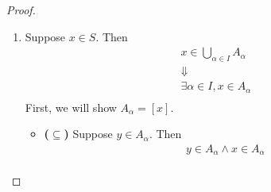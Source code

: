 \begin{proof}
\begin{enumerate}[label=\textbf{(\Alph*)}]
\begin{itemize}
\begin{itemize}
                  \end{itemize}
                  Then
                  \begin{itemize}
                    \item $\exists \alpha \in I, x \in A_{\alpha} \land y \in A_{\alpha}$
                    \item $\exists \beta \in I, y \in A_{\beta} \land z \in A_{\beta}$
                  \end{itemize}
                  Therefore,
                  \[
                    \begin{array}{c}
                      y \in A_{\alpha} \land y \in A_{\beta}  \\
                      \Downarrow                              \\
                      A_{\alpha} \cap A_{\beta} \neq \vnot    \\
                      \Downarrow                              \\
                      \alpha = \beta                          \\
                      \Downarrow                              \\
                      x \in A_{\alpha} \land z \in A_{\alpha} \\
                      \Downarrow                              \\
                      x \sim z
                    \end{array}
                  \]
          \end{itemize}
    \item Suppose $x \in S$. Then
          \[
            \begin{array}{c}
              x \in \bigcup_{\alpha \in I} A_{\alpha} \\
              \Downarrow                              \\
              \exists \alpha \in I, x \in A_{\alpha}  \\
            \end{array}
          \]
          First, we will show $A_{\alpha} = [x]$.
          \begin{itemize}
            \item \textbf{($\subseteq$)} Suppose $y \in A_{\alpha}$. Then
                  \[
                    \begin{array}{c}
                      y \in A_{\alpha} \land x \in A_{\alpha} \\

\end{array}\]
\end{itemize}
\end{enumerate}
\end{proof}

